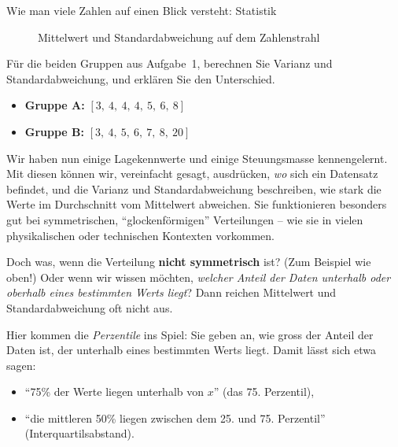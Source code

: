 \begin{lpu}{Wie man viele Zahlen auf einen Blick versteht: Statistik}
\begin{figure}[h]
\caption{Mittelwert und Standardabweichung auf dem Zahlenstrahl}
\end{figure}



\begin{aufgabe}{2}
Für die beiden Gruppen aus Aufgabe~1, berechnen Sie Varianz und Standardabweichung, und erklären Sie den Unterschied.
\begin{itemize}
\item \textbf{Gruppe A:} $[3,\ 4,\ 4,\ 4,\ 5,\ 6,\ 8]$
\item \textbf{Gruppe B:} $[3,\ 4,\ 5,\ 6,\ 7,\ 8,\ 20]$
\end{itemize}
\end{aufgabe}

Wir haben nun einige Lagekennwerte und einige Steuungsmasse kennengelernt. Mit diesen können wir, vereinfacht gesagt, ausdrücken, \textit{wo} sich ein Datensatz befindet, und die Varianz und Standardabweichung beschreiben, wie stark die Werte im Durchschnitt vom Mittelwert abweichen. Sie funktionieren besonders gut bei symmetrischen, ``glockenförmigen'' Verteilungen – wie sie in vielen physikalischen oder technischen Kontexten vorkommen.

Doch was, wenn die Verteilung \textbf{nicht symmetrisch} ist? (Zum Beispiel wie oben!) Oder wenn wir wissen möchten, \emph{welcher Anteil der Daten unterhalb oder oberhalb eines bestimmten Werts liegt}? Dann reichen Mittelwert und Standardabweichung oft nicht aus.

Hier kommen die \textit{Perzentile} ins Spiel: Sie geben an, wie gross der Anteil der Daten ist, der unterhalb eines bestimmten Werts liegt. Damit lässt sich etwa sagen:

\begin{itemize}
  \item ``75\% der Werte liegen unterhalb von $x$'' (das 75. Perzentil),
  \item ``die mittleren 50\% liegen zwischen dem 25. und 75. Perzentil'' (Interquartilsabstand).
\end{itemize}


\end{lpu}
